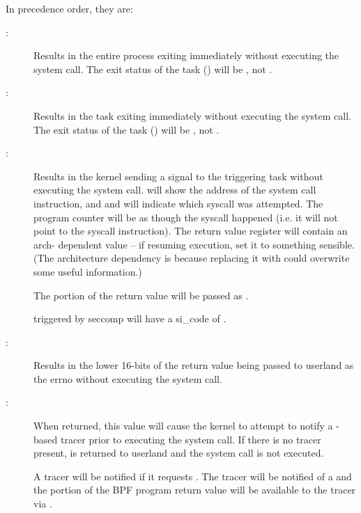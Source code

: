 \documentclass[a4paper,8pt,english]{sphinxmanual}
\begin{document}
In precedence order, they are:
\begin{description}
\item[{:}] \leavevmode
Results in the entire process exiting immediately without executing
the system call.  The exit status of the task ()
will be , not .

\item[{:}] \leavevmode
Results in the task exiting immediately without executing the
system call.  The exit status of the task () will
be , not .

\item[{:}] \leavevmode
Results in the kernel sending a  signal to the triggering
task without executing the system call. 
will show the address of the system call instruction, and
 and  will indicate which
syscall was attempted.  The program counter will be as though
the syscall happened (i.e. it will not point to the syscall
instruction).  The return value register will contain an arch-
dependent value -- if resuming execution, set it to something
sensible.  (The architecture dependency is because replacing
it with  could overwrite some useful information.)

The  portion of the return value will be passed
as .

 triggered by seccomp will have a si\_code of .

\item[{:}] \leavevmode
Results in the lower 16-bits of the return value being passed
to userland as the errno without executing the system call.

\item[{:}] \leavevmode
When returned, this value will cause the kernel to attempt to
notify a -based tracer prior to executing the system
call.  If there is no tracer present,  is returned to
userland and the system call is not executed.

A tracer will be notified if it requests .  The tracer will be notified
of a  and the  portion of
the BPF program return value will be available to the tracer
via .


\end{description}
\end{document}
